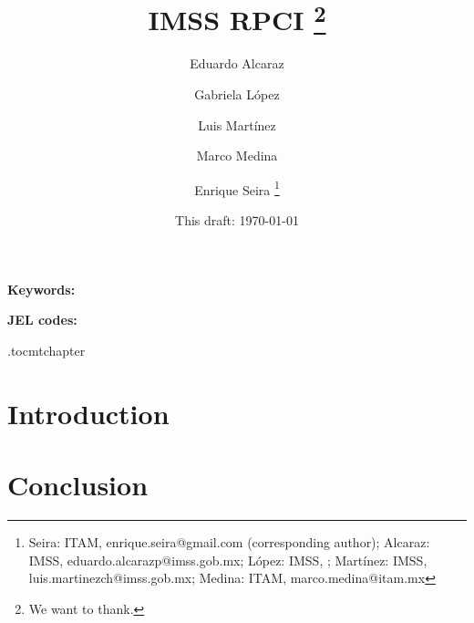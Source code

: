 \documentclass[oneside,11pt]{article}
\begin{document}
\title{IMSS RPCI \thanks{We want to thank.}}
\author{Eduardo Alcaraz \and Gabriela López \and Luis Martínez \and Marco Medina \and Enrique Seira  \thanks{Seira: ITAM, enrique.seira@gmail.com (corresponding author); Alcaraz: IMSS, eduardo.alcarazp@imss.gob.mx; López: IMSS, ; Martínez: IMSS, luis.martinezch@imss.gob.mx; Medina:  ITAM, marco.medina@itam.mx}}
\date{This draft:  \today \\[2 cm]}



\maketitle
\thispagestyle{empty}
\begin{abstract}


\end{abstract}

\vspace{.3in}

\textbf{Keywords: }

\textbf{JEL codes:}

\newpage

\etocdepthtag.toc{mtchapter}

\section{Introduction} \label{introduction}


\clearpage

\section{Conclusion} \label{conclusion}


\newpage


\clearpage

%
%
%




\clearpage
\singlespacing
\end{document}
